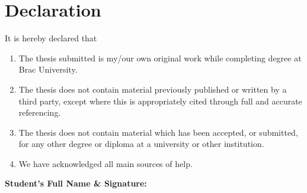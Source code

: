 \newcommand*\wildcard[2][6cm]{\vspace{1cm}\parbox{#1}{\hrulefill\par#2}} 


\section*{Declaration}

It is hereby declared that

\begin{enumerate} %
  \item The thesis submitted is my/our own original work while completing degree at Brac University.
  \item The thesis does not contain material previously published or written by a third party, except where this is appropriately cited through full and accurate referencing.
  \item The thesis does not contain material which has been accepted, or submitted, for any other degree or diploma at a university or other institution.
  \item We have acknowledged all main sources of help.
\end{enumerate}

\vspace{1cm}
\textbf{Student’s Full Name \& Signature:} %
\vspace{.5cm}

